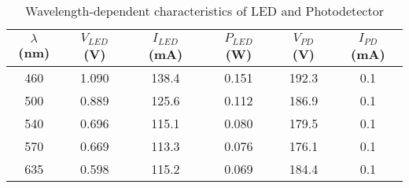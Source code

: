 \begin{table}[H]
    \centering
    \begin{tabular}{|c|c|c|c|c|c|}
    \hline
    $\lambda$ (nm) & $V_{LED}$ (V) & $I_{LED}$ (mA) & $ P_{LED}$ (W) & $V_{PD}$ (V) & $I_{PD}$ (mA)  \\ \hline
    460 & 1.090 & 138.4 & 0.151 & 192.3 & 0.1 \\
    500 & 0.889 & 125.6 & 0.112 & 186.9 & 0.1 \\
    540 & 0.696 & 115.1 & 0.080 & 179.5 & 0.1 \\
    570 & 0.669 & 113.3 & 0.076 & 176.1 & 0.1 \\
    635 & 0.598 & 115.2 & 0.069 & 184.4 & 0.1 \\ \hline

    \end{tabular}
\caption{Wavelength-dependent characteristics of LED and Photodetector}
\end{table}